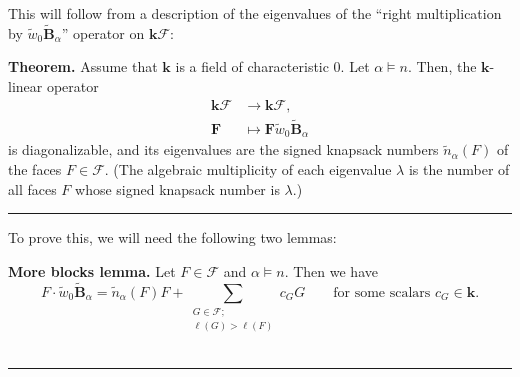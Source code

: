 \documentclass[12pt]{article}
\theoremstyle{definition}%
\newtheorem{thm}{Theorem}[section]
\newtheorem{lem}[thm]{Lemma}
\theoremstyle{definition}%
\theoremstyle{remark}%
\newcommand{\tup}[1]{\left( #1 \right)}
\newcommand{\kk}{\mathbf{k}}
\newcommand{\kf}{\kk\mathcal{F}}
\newcommand{\BBta}{\widetilde{\mathbf{B}}_{\alpha}}
\newcommand{\FF}{\mathbf{F}}
\newcommand{\CF}{\mathcal{F}}
\newcommand{\wotil}{\widetilde{w}_0}
\newcommand{\nna}{\widetilde{n}_{ \alpha } }%
\newenvironment{thm}[1][Theorem]{\noindent\textbf{#1.} }{\ \rule{0.5em}{0.5em}}
\newenvironment{lem}[1][Lemma]{\noindent\textbf{#1.} }{\ \rule{0.5em}{0.5em}}
\begin{document}
This will follow from a description of the eigenvalues of the ``right multiplication by $\wotil\BBta$'' operator on $\kf$:

\begin{thm}
\label{thm.spec.w0Baright}
Assume that $\kk$ is a field of characteristic $0$.
Let $\alpha \models n$.
Then, the $\kk$-linear operator
\begin{align*}
\kf  & \to \kf,\\
\FF  & \mapsto \FF\wotil\BBta
\end{align*}
is diagonalizable, and its eigenvalues are the signed knapsack numbers
$\nna\tup{F} $ of the faces $F\in \CF$.
(The algebraic multiplicity of each eigenvalue $\lambda$ is the number
of all faces $F$ whose signed knapsack number is $\lambda$.)
\end{thm}

To prove this, we will need the following two lemmas:

\begin{lem}[More blocks lemma]
    \label{mblks_lem}
    Let $F \in \CF$ and $\alpha \models n$. Then we have
    \[
    F\cdot \wotil\BBta = \nna \tup{F}F + \sum_{\substack{G \in \CF;\\ \ell \tup{G} > \ell \tup{F}}} c_{G}G
	\qquad \text{for some scalars $c_G \in \kk$.}
    \]
\end{lem}
\end{document}
